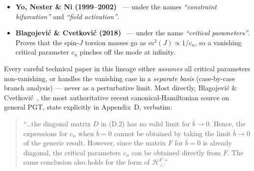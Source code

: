 \begin{itemize}
{    \texttt{pdftotext} of \texttt{literature/PhysRevD.28.2455/} during the
    Phase~2.4 lead investigation, see
    \texttt{research/perturbative_hamiltonian/notes/lead_bn1983_direct_read.md}.}
    The constraint-promotion phenomenon \emph{specific to TIDAL's case} has
    therefore been an acknowledged-as-open research question since 1983 ---
    not 25~years (counting from BC~2018) but 40~years (counting from BN~1983
    PRD through YNN 1999--2002 to BC~2018).
    [Citation correction 2026-04-27: the second BN paper was previously
    mis-cited as Nuovo Cim B \textbf{84}:25 (1984); the actual paper is
    \emph{Hamiltonian Structure of the Theory of Gravity with $R + T^2$ Type
    of Lagrangian}, Nuovo Cim. B \textbf{73}:258 (1983), DOI:
    10.1007/BF02721794 (see \texttt{literature/BF02721794/}).]
  \item \textbf{Yo, Nester \& Ni (1999--2002)}~\cite{YoNester1999,YoNester2002}
    --- under the names \emph{``constraint bifurcation''} and
    \emph{``field activation''}.
  \item \textbf{Blagojevi\'c \& Cvetkovi\'c (2018)}~\cite{BlagojevicCvetkovic2018}
    --- under the name \emph{``critical parameters''}.  Proves that the
    spin-$J$ torsion masses go as $m^2(J) \propto 1/c_n$, so a vanishing
    critical parameter $c_n$ pinches off the mode at infinity.
\end{itemize}

Every careful technical paper in this lineage either \emph{assumes} all
critical parameters non-vanishing, or handles the vanishing case in a
\emph{separate basis} (case-by-case branch analysis) --- never as a
perturbative limit.  Most directly,
Blagojevi\'c \& Cvetkovi\'c~\cite{BlagojevicCvetkovic2018}, the most
authoritative recent canonical-Hamiltonian source on general PGT, state
explicitly in Appendix~D, verbatim:

\begin{quote}
``\dots the diagonal matrix $D$ in (D.2) has no valid limit for
$\bar{b} \to 0$.  Hence, the expressions for $c_n$ when $\bar{b} = 0$
cannot be obtained by taking the limit $\bar{b} \to 0$ of the generic
result.  However, since the matrix $F$ for $\bar{b} = 0$ is already
diagonal, the critical parameters $c_n$ can be obtained directly from
$F$.  The same conclusion also holds for the form of $\mathcal{H}^F_\perp$.''
\end{quote}


